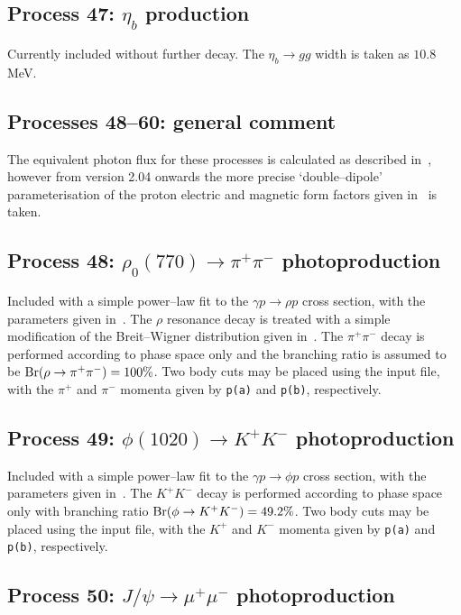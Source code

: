 \documentclass[12pt]{article}
\begin{document}
\subsection{Process 47: $\eta_b$ production}

Currently included without further decay. The $\eta_b \to gg$ width is taken as $10.8$ MeV.

\subsection{Processes 48--60: general comment}

The equivalent photon flux for these processes is calculated as described in~\cite{Harland-Lang:2015cta}, however from version 2.04 onwards the 
more precise `double--dipole' parameterisation of the proton electric and magnetic form factors given in~\cite{Bernauer:2013tpr} is taken.

\subsection{Process 48: $\rho_0(770)\to \pi^+\pi^-$ photoproduction}

Included with a simple power--law fit to the $\gamma p\to \rho p$ cross section, with the parameters given in~\cite{Harland-Lang:2015cta}. 
The $\rho$ resonance decay is treated with a simple modification of the Breit--Wigner distribution given in~\cite{Leupold:1997dg}. The $\pi^+\pi^-$ 
decay is performed according to phase space only and the branching ratio is assumed to be ${\rm Br}(\rho \to \pi^+\pi^-)=100\%$. Two body cuts may be
 placed using the input file, with the $\pi^+$ and $\pi^-$  momenta given by \texttt{p(a)} and \texttt{p(b)}, respectively.

\subsection{Process 49: $\phi(1020)\to K^+K^-$ photoproduction}

Included with a simple power--law fit to the $\gamma p\to \phi p$ cross section, with the parameters given in~\cite{Harland-Lang:2015cta}. 
The $K^+K^-$ decay is performed according to phase space only with branching ratio ${\rm Br}(\phi \to K^+K^-)=49.2\%$. Two body cuts may be placed
 using the input file, with the $K^+$ and $K^-$  momenta given by \texttt{p(a)} and \texttt{p(b)}, respectively.


\subsection{Process 50: $J/\psi\to \mu^+\mu^-$ photoproduction}
\end{document}

